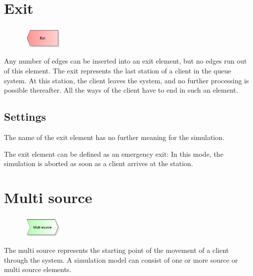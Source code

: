 \section{Exit}
\label{ref:ModelElementDispose}

\begin{figure}
\vspace{-22pt}
\includegraphics[width=2cm]{imageModelElementDispose.png}
\vspace{-22pt}
\end{figure}

Any number of edges can be inserted into an exit element, but no edges run out of this element.
The exit represents the last station of a client in the queue system.
At this station, the client leaves the system, and no further processing is possible thereafter.
All the ways of the client have to end in such an element.

\subsection*{Settings}

The name of the exit element has no further meaning for the simulation.

The exit element can be defined as an emergency exit: In this mode, the simulation is aborted
as soon as a client arrives at the station.


\section{Multi source}
\label{ref:ModelElementSourceMulti}

\begin{figure}
\vspace{-22pt}
\includegraphics[width=2cm]{imageModelElementSourceMulti.png}
\vspace{-22pt}
\end{figure}

The multi source represents the starting point of the movement of a client through the system.
A simulation model can consist of one or more source or multi source elements.

